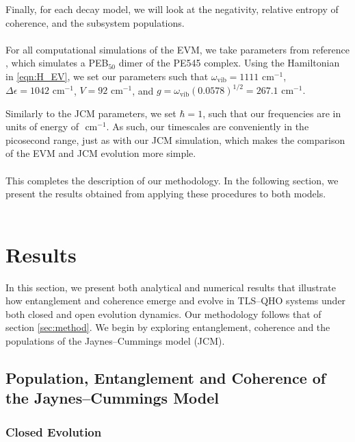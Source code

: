 \documentclass[11pt]{article}
\begin{document}
Finally, for each decay model, we will look at the negativity, relative entropy of coherence, and the subsystem populations.\\
\\
For all computational simulations of the EVM, we take parameters from reference \cite{ExVib2014-Alexandra}, which simulates a PEB$_50$ dimer of the PE545 complex. Using the Hamiltonian in \eqref{eqn:H_EV}, we set our parameters such that $\omega_{\scriptscriptstyle \text{vib}} = 1111 \text{ cm}^{-1}$, $\Delta\epsilon = 1042\text{ cm}^{-1}$, $V = 92 \text{ cm}^{-1}$, and $g = \omega_{\scriptscriptstyle \text{vib}}(0.0578)^{1/2} = 267.1 \text{ cm}^{-1}.$ 

Similarly to the JCM parameters, we set $\hbar = 1$, such that our frequencies are in units of energy of $\text{ cm}^{-1}.$ As such, our timescales are conveniently in the picosecond range, just as with our JCM simulation, which makes the comparison of the EVM and JCM evolution more simple.\\
\\
This completes the description of our methodology. In the following section, we present the results obtained from applying these procedures to both models.\\
\\
\newpage
\section{Results} \label{sec:results}

In this section, we present both analytical and numerical results that illustrate how entanglement and coherence emerge and evolve in TLS--QHO systems under both closed and open evolution dynamics. Our methodology follows that of section \ref{sec:method}. We begin by exploring entanglement, coherence and the populations of the Jaynes--Cummings model (JCM). 

\subsection{Population, Entanglement and Coherence of the Jaynes--Cummings Model}  \label{sec:results_JCM}
\subsubsection{Closed Evolution}
\end{document}
